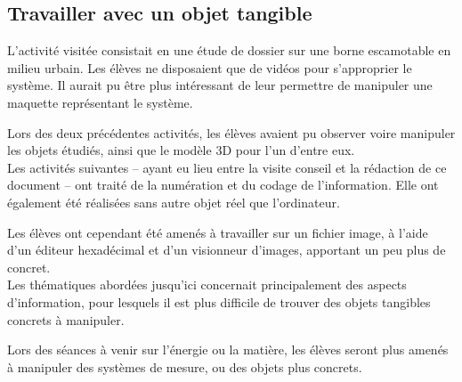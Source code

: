 \documentclass[pdftex,a4paper,12pt]{article}
\begin{document}
	\subsection{Travailler avec un objet tangible}
	L'activité visitée consistait en une étude de dossier sur une borne escamotable en milieu urbain.
	Les élèves ne disposaient que de vidéos pour s'approprier le système. 
	Il aurait pu être plus intéressant de leur permettre de manipuler une maquette représentant le système.

	Lors des deux précédentes activités, les élèves avaient pu observer voire manipuler les objets étudiés, ainsi que le modèle 3D pour l'un d'entre eux.\\

	Les activités suivantes -- ayant eu lieu entre la visite conseil et la rédaction de ce document -- ont traité de la numération et du codage de l'information.
	Elle ont également été réalisées sans autre objet réel que l'ordinateur.
	
	Les élèves ont cependant été amenés à travailler sur un fichier image, à l'aide d'un éditeur hexadécimal et d'un visionneur d'images, 
	apportant un peu plus de concret.\\

	Les thématiques abordées jusqu'ici concernait principalement des aspects d'information, 
	pour lesquels il est plus difficile de trouver des objets tangibles concrets à manipuler. 
	
	Lors des séances à venir sur l'énergie ou la matière, les élèves seront plus amenés à manipuler des systèmes de mesure, ou des objets plus concrets.\\
\end{document}
